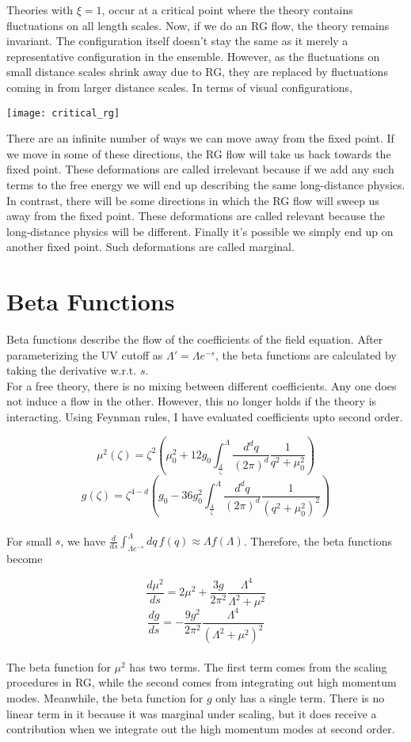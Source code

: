 \noindent Theories with $\xi=1$, occur at a critical point where the theory contains fluctuations on all length scales. Now, if we do an RG flow, the theory remains invariant. The configuration itself doesn't stay the same as it merely a representative configuration in the ensemble. However, as the fluctuations on small distance scales shrink away due to RG, they are replaced by fluctuations coming in from larger distance scales. In terms of visual configurations,

\begin{center}
    \texttt{[image: critical\_rg]}
\end{center}

\noindent There are an infinite number of ways we can move away from the fixed point. If we move in some of these directions, the RG flow will take us back towards the fixed point. These deformations are called irrelevant because if we add any such terms to the free energy we will end up describing the same long-distance physics. In contrast, there will be some directions in which the RG flow will sweep us away from the fixed point. These deformations are called relevant because the long-distance physics will be different. Finally it's possible we simply end up on another fixed point. Such deformations are called marginal.

\section{Beta Functions}
Beta functions describe the flow of the coefficients of the field equation. After parameterizing the UV cutoff as $\Lambda'=\Lambda e^{-s}$, the beta functions are calculated by taking the derivative w.r.t. $s$.\\

\noindent For a free theory, there is no mixing between different coefficients. Any one does not induce a flow in the other. However, this no longer holds if the theory is interacting. Using Feynman rules, I have evaluated coefficients upto second order.

$$\mu^2(\zeta)=\zeta^2\left(\mu_0^2+12g_0\int_\frac{\Lambda}{\zeta}^\Lambda \frac{d^dq}{(2\pi)^d}\frac{1}{q^2+\mu_0^2}\right)$$
$$g(\zeta)=\zeta^{4-d}\left(g_0-36g_0^2\int_\frac{\Lambda}{\zeta}^\Lambda \frac{d^dq}{(2\pi)^d}\frac{1}{(q^2+\mu_0^2)^2}\right)$$\\

\noindent For small $s$, we have $\frac{d}{ds}\int_{\Lambda e^{-s}}^\Lambda dq\,f(q)\approx \Lambda f(\Lambda)$. Therefore, the beta functions become

$$\frac{d\mu^2}{ds}=2\mu^2+\frac{3g}{2\pi^2}\frac{\Lambda^4}{\Lambda^2+\mu^2}$$
$$\frac{dg}{ds}=-\frac{9g^2}{2\pi^2}\frac{\Lambda^4}{(\Lambda^2+\mu^2)^2}$$\\

\noindent The beta function for $\mu^2$ has two terms. The first term comes from the scaling procedures in RG, while the second comes from integrating out high momentum modes. Meanwhile, the beta function for $g$ only has a single term. There is no linear term in it because it was marginal under scaling, but it does receive a contribution when we integrate out the high momentum modes at second order.